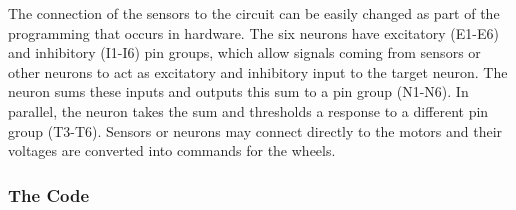 \documentclass[11pt]{article}
\begin{document}
The connection of the sensors to the circuit can be easily changed as part of the programming that occurs in hardware.  The six neurons
have excitatory (E1-E6) and inhibitory (I1-I6) pin groups, which allow signals coming from sensors or other neurons to act as excitatory
 and inhibitory input to the target neuron. The neuron sums these inputs and outputs this sum to a pin group (N1-N6). In parallel, 
the neuron takes the sum and thresholds a response to a different pin group (T3-T6). Sensors or neurons may connect directly to the motors and their voltages are converted into commands for the wheels. 

\subsubsection*{The Code}
\label{sec:orgheadline19}
\end{document}
